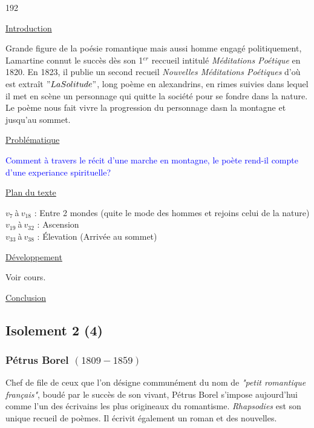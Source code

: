 \documentclass[12pt,a4paper]{article}
\begin{document}
\begin{dingautolist}{192}

\item \underline{Introduction} \par
		Grande figure de la po\'esie romantique mais aussi homme engag\'e politiquement, Lamartine connut le succ\`es d\`es son 1$^{er}$ reccueil intitul\'e \textit{M\'editations Po\'etique} en 1820. 
		En 1823, il publie un second recueil \textit{Nouvelles M\'editations Po\'etiques} d'o\`u est extra\^it $"La Solitude"$, 
		long po\`eme en alexandrins, en rimes suivies dans lequel il met en sc\`ene un personnage qui quitte la soci\'et\'e pour se fondre dans la nature. 
		Le po\`eme nous fait vivre la progression du personnage dasn la montagne et jusqu'au sommet.

\item \underline{Probl\'ematique }\par
		\textcolor{blue}{Comment \`a travers le r\'ecit d'une marche en montagne, le po\`ete rend-il compte d'une experiance spirituelle?}

\item \underline{Plan du texte} \par
		$v_{7}~$\`a$~v_{18}$ : Entre 2 mondes (quite le mode des hommes et rejoins celui de la nature)\\
		$v_{19}~$\`a$~v_{32}$ : Ascension\\
		$v_{33}~$\`a$~v_{38}$ : \'Elevation (Arriv\'ee au sommet)

\item \underline{D\'eveloppement} \par
		Voir cours.

\item \underline{Conclusion} \par


\end{dingautolist}
 \newpage

			\subsection{Isolement 2 (4)}
				\subsubsection{P\'etrus Borel $(1809-1859)$}
		Chef de file de ceux que l'on d\'esigne commun\'ement du nom de \textit{"petit romantique fran\c cais"}, boud\'e par le succ\`es de son vivant, 
		P\'etrus Borel s'impose aujourd'hui comme l'un des \'ecrivains les plus origineaux du romantisme. \textit{Rhapsodies} est son unique recueil de po\`emes. Il \'ecrivit \'egalement un roman et des nouvelles.
\end{document}
